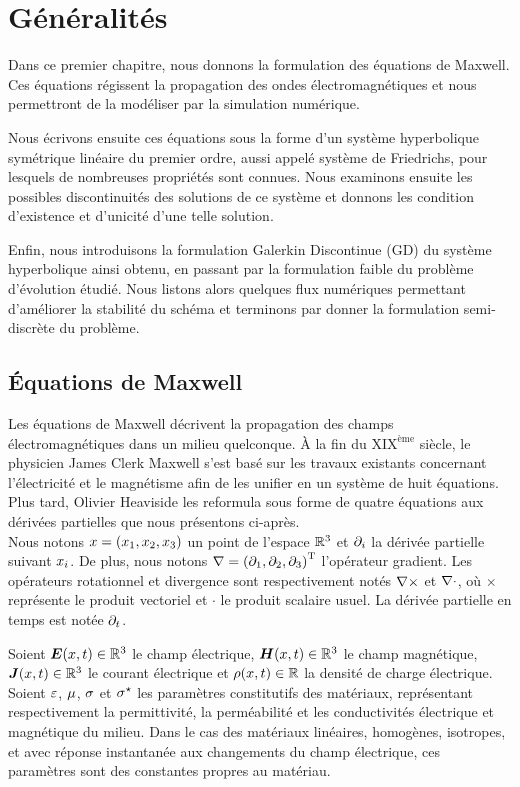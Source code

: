 \chapter{Généralités}
\label{chap:generalites}

Dans ce premier chapitre, nous donnons la formulation des équations de Maxwell.
Ces équations régissent
la propagation des ondes électromagnétiques et nous permettront
de la modéliser par la simulation numérique.

Nous écrivons ensuite ces équations sous la forme d’un
système hyperbolique symétrique linéaire du premier ordre, aussi appelé système de Friedrichs,
pour lesquels de nombreuses propriétés sont connues.
Nous examinons
ensuite les possibles discontinuités des solutions de ce système
et donnons les condition d'existence et d'unicité d'une
telle solution.

Enfin, nous introduisons la formulation Galerkin Discontinue (GD)
du système hyperbolique ainsi obtenu, en passant par la formulation faible
du problème d'évolution étudié. 
Nous listons alors quelques flux numériques permettant
d'améliorer la stabilité du schéma
et terminons par donner la formulation semi-discrète du problème.
\\


\section{Équations de Maxwell}
\label{sect:equations_de_maxwell}

Les équations de Maxwell décrivent la propagation des champs électromagnétiques
dans un milieu quelconque. À la fin du $\textrm{XIX}^\textrm{ème}$ siècle, le physicien James Clerk Maxwell
s’est basé sur les travaux existants concernant l’électricité et le magnétisme afin
de les unifier en un système de huit équations. Plus tard, Olivier Heaviside les
reformula sous forme de quatre équations aux dérivées partielles
que nous présentons ci-après.
\\

Nous notons $x = \left({x}_1,{x}_2,{x}_3\right)$ un point de l’espace
$\mathbb{R}^{3}$ et $\partial_{i}$ la dérivée partielle suivant $x_i$. 
De plus, nous notons $\nabla = \left({\partial}_1,{\partial}_2,{\partial}_3\right)^{\mathrm{T}}$
l’opérateur gradient. Les opérateurs rotationnel et divergence
sont respectivement notés $\nabla\times$ et $\nabla\cdot$, où $\times$ représente
le produit vectoriel et $\cdot$ le produit scalaire usuel.
La dérivée partielle en temps est notée $\partial_{t}$.

Soient $\bm{E}(x,t) \in \mathbb{R}^{3}$ le champ électrique,
$\bm{H}(x,t) \in \mathbb{R}^{3}$ le champ magnétique,
$\bm{J}(x,t) \in \mathbb{R}^{3}$ le courant électrique et
$\rho(x,t) \in \mathbb{R}$ la densité de charge électrique.
Soient $\varepsilon$, $\mu$, $\sigma$ et $\sigma^\star$ les
paramètres constitutifs des matériaux, représentant respectivement
la permittivité, la perméabilité et les conductivités électrique et magnétique
du milieu. Dans le cas des matériaux linéaires, homogènes, isotropes, et avec réponse
instantanée aux changements du champ électrique, ces paramètres sont des constantes
propres au matériau.

